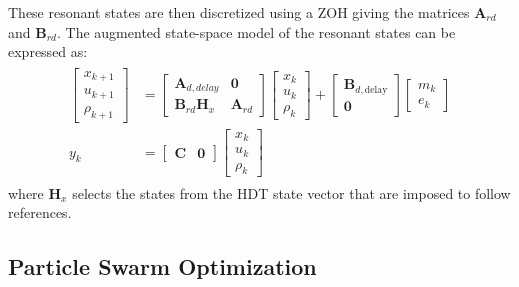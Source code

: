 These resonant states are then discretized using a ZOH giving the matrices $\mathbf{A}_{rd}$ and $\mathbf{B}_{rd}$. The augmented state-space model of the resonant states can be expressed as:
\begin{align}
    \begin{aligned}
        \begin{bmatrix}
            x_{k + 1}\\
            u_{k + 1}\\
            \rho_{k + 1}
        \end{bmatrix}
        &=
        \begin{bmatrix}
            \mathbf{A}_{d,delay} & \mathbf{0} \\
            \mathbf{B}_{rd}\mathbf{H}_x & \mathbf{A}_{rd}
        \end{bmatrix}
        \begin{bmatrix}
            x_k\\
            u_k\\
            \rho_k
        \end{bmatrix}
        +
        \begin{bmatrix}
            \mathbf{B}_{d,\text{delay}}\\
            \mathbf{0}
        \end{bmatrix}
        \begin{bmatrix}
            m_k\\
            e_k
        \end{bmatrix}
        \\
        y_k &= 
        \begin{bmatrix}
            \mathbf{C} & \mathbf{0}
        \end{bmatrix}
        \begin{bmatrix}
            x_k\\
            u_k\\
            \rho_k
        \end{bmatrix}
    \end{aligned}
\end{align}
where $\mathbf{H}_x$ selects the states from the HDT state vector that are imposed to follow references.

\subsection{Particle Swarm Optimization}

